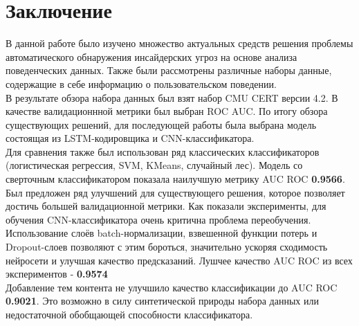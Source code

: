 \chapter{Заключение}

В данной работе было изучено множество актуальных средств решения проблемы автоматического обнаружения инсайдерских угроз на основе анализа поведенческих данных. Также были рассмотрены различные наборы данные, содержащие в себе информацию о пользовательском поведении.\\

В результате обзора набора данных был взят набор CMU CERT версии 4.2. В качестве валидационнной метрики был выбран ROC AUC. По итогу обзора существующих решений, для последующей работы была выбрана модель состоящая из LSTM-кодировщика и CNN-классификатора.
\\
Для сравнения также был использован ряд классических классификаторов (логистическая регрессия, SVM, KMeans, случайный лес). Модель со сверточным классификатором показала наилучшую метрику AUC ROC \textbf{0.9566}.\\

Был предложен ряд улучшений для существующего решения, которое позволяет достичь большей валидационной метрики. Как показали эксперименты, для обучения CNN-классификатора очень критична проблема переобучения. Использование слоёв batch-нормализации, взвешенной функции потерь и Dropout-слоев позволяют с этим бороться, значительно ускоряя сходимость нейросети и улучшая качество предсказаний. Лушчее качество AUC ROC из всех экспериментов - \textbf{0.9574}\\

Добавление тем контента не улучшило качество классификации до AUC ROC \textbf{0.9021}. Это возможно в силу синтетической природы набора данных или недостаточной обобщающей способности классификатора.